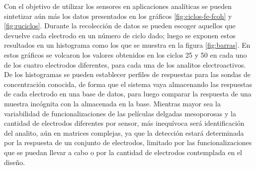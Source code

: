 	Con el objetivo de utilizar los sensores en aplicaciones analíticas se pueden sintetizar aún más los datos presentados en los gráficos \ref{fig:ciclos-fe-fcoh} y \ref{fig:ruciclos}. Durante la recolección de datos se pueden escoger aquellos que devuelve cada electrodo en un número de ciclo dado; luego se exponen estos resultados en un histograma como los que se muestra en la figura \ref{fig:barras}. En estos gráficos se volcaron los valores obtenidos en los ciclos 25 y 50 en cada uno de los cuatro electrodos diferentes, para cada una de los analitos electroactivos. De los histogramas se pueden establecer perfiles de respuestas para las sondas de concentración conocida, de forma que el sistema vaya almacenando las respuestas de cada electrodo en una base de datos, para luego comparar la respuesta de una muestra incógnita con la almacenada en la base. Mientras mayor sea la variabilidad de funcionalizaciones de las películas delgadas mesoporosas y la cantidad de electrodos diferentes por sensor, más inequívoca será identificación del analito, aún en matrices complejas, ya que la detección estará determinada por la respuesta de un conjunto de electrodos, limitado por las funcionalizaciones que se puedan llevar a cabo o por la cantidad de electrodos contemplada en el diseño.
   		

